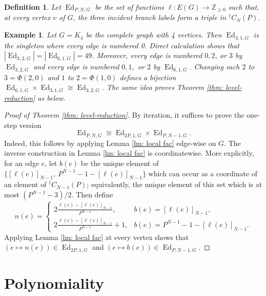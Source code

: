 \documentclass[11pt]{amsart}
\newtheorem{definition}[theorem]{Definition}
\newtheorem{example}[theorem]{Example}
\newcommand{\Ed}{\operatorname{Ed}}
\begin{document}
\begin{definition}\cite[\S5.1]{KW}\label{def: Ed}
Let $\Ed_{P,N,G}$ be the set of functions
 $\ell:E(G)\to \mathbb{Z}_{\geq 0}$
such that, at every vertex $v$ of $G$, the three incident branch labels form a
triple in ${}^\dagger C_N(P)$.
\end{definition}

\begin{example}
    Let $G=K_4$ be the complete graph with 4 vertices.
    Then $\Ed_{3,1,G}$ is the singleton where every edge is numbered 0.
    Direct calculation shows that $|\Ed_{3,2,G}|=|\Ed_{6,1,G}|=49$.
    Moreover, every edge is numbered $0,2$, or $3$ by $\Ed_{3,2,G}$ and every edge is numbered $0,1,$ or $2$ by $\Ed_{6,1,G}$. Changing each $2$ to $3=\Phi(2,0)$ and $1$ to $2=\Phi(1,0)$ defines a bijection $\Ed_{6,1,G}\times \Ed_{3,1,G}\cong \Ed_{3,2,G}$.
    The same idea proves Theorem \ref{thm: level-reduction} as below.
\end{example}

\begin{proof}[Proof of Theorem \ref{thm: level-reduction}]
    By iteration, it suffices to prove the one-step version
\[\Ed_{P,N,G}\cong \Ed_{2P,1,G}\times \Ed_{P,N-1,G}.\]
Indeed, this follows by applying Lemma \ref{lm: local fac} edge-wise on $G$.
The inverse construction in Lemma \ref{lm: local fac} is
coordinatewise.  More explicitly, for an edge $e$, let $b(e)$ be the unique element of
$\{[\ell(e)]_{N-1},\ P^{N-1}-1-[\ell(e)]_{N-1}\}$
which can occur as a coordinate of an element of ${}^\dagger C_{N-1}(P)$;
equivalently, the unique element of this set which is at most $(P^{N-1}-3)/2$.
Then define
\[
        n(e)=
        \begin{cases}
        2\frac{\ell(e)-[\ell(e)]_{N-1}}{P^{N-1}},& b(e)=[\ell(e)]_{N-1},\\[6pt]
        2\frac{\ell(e)-[\ell(e)]_{N-1}}{P^{N-1}}+1,& b(e)=P^{N-1}-1-[\ell(e)]_{N-1}.
        \end{cases}
\] 
Applying Lemma \ref{lm: local fac} at every vertex shows that
$(e\mapsto n(e))\in \Ed_{2P,1,G}$ and
$(e\mapsto b(e))\in \Ed_{P,N-1,G}$.
\end{proof}









\section{Polynomiality}\label{sec: polynomiality}
\end{document}
